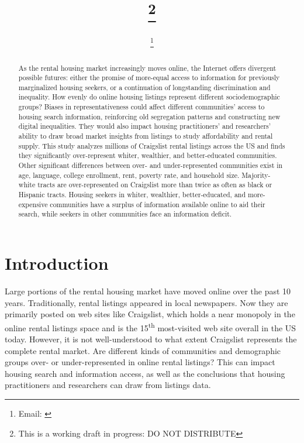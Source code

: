 \documentclass[11pt,onecolumn]{article} %
\begin{document}
	
\title{\papertitle\footnote{This is a working draft in progress: DO NOT DISTRIBUTE}}
\date{\paperdate}
\author[]{\myname \thanks{Email: \href{mailto:\myemail}{\myemail}}}
\affil[]{\myaffiliation}

\maketitle

\begin{abstract}
As the rental housing market increasingly moves online, the Internet offers divergent possible futures: either the promise of more-equal access to information for previously marginalized housing seekers, or a continuation of longstanding discrimination and inequality. How evenly do online housing listings represent different sociodemographic groups? Biases in representativeness could affect different communities' access to housing search information, reinforcing old segregation patterns and constructing new digital inequalities. They would also impact housing practitioners' and researchers' ability to draw broad market insights from listings to study affordability and rental supply. This study analyzes millions of Craigslist rental listings across the US and finds they significantly over-represent whiter, wealthier, and better-educated communities. Other significant differences between over- and under-represented communities exist in age, language, college enrollment, rent, poverty rate, and household size. Majority-white tracts are over-represented on Craigslist more than twice as often as black or Hispanic tracts. Housing seekers in whiter, wealthier, better-educated, and more-expensive communities have a surplus of information available online to aid their search, while seekers in other communities face an information deficit.
\vspace{1cm}
\end{abstract}




\section{Introduction}

Large portions of the rental housing market have moved online over the past 10 years. Traditionally, rental listings appeared in local newspapers. Now they are primarily posted on web sites like Craigslist, which holds a near monopoly in the online rental listings space and is the 15\textsuperscript{th} most-visited web site overall in the US today. However, it is not well-understood to what extent Craigslist represents the complete rental market. Are different kinds of communities and demographic groups over- or under-represented in online rental listings? This can impact housing search and information access, as well as the conclusions that housing practitioners and researchers can draw from listings data.
\end{document}
